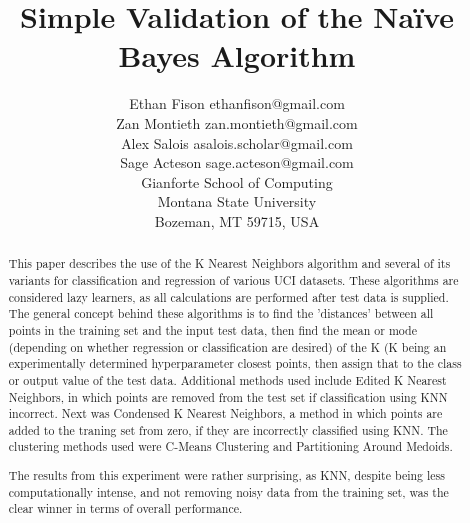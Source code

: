 \documentclass[twoside,11pt]{article}
\begin{document}
\title{Simple Validation of the Naïve Bayes Algorithm}

\author{\name Ethan Fison \email ethanfison@gmail.com \\
        \name Zan Montieth \email zan.montieth@gmail.com \\
        \name Alex Salois \email asalois.scholar@gmail.com \\ 
        \name Sage Acteson \email sage.acteson@gmail.com \\ 
       \addr Gianforte School of Computing\\
       Montana State University\\
       Bozeman, MT 59715, USA}



\maketitle

\begin{abstract}%

This paper describes the use of the K Nearest Neighbors algorithm and several of 
its variants for classification and regression of various UCI datasets. These
algorithms are considered lazy learners, as all calculations are performed after
test data is supplied. The general concept behind these algorithms is to find 
the 'distances' between all points in the training set and the input test data, then
find the mean or mode (depending on whether regression or classification are desired)
of the K (K being an experimentally determined hyperparameter closest points, then 
assign that to the class or output value of the test data. Additional methods used include 
Edited K Nearest Neighbors, in which points are removed from the test set if classification
using KNN incorrect. Next was Condensed K Nearest Neighbors, a method in which points are
added to the traning set from zero, if they are incorrectly classified using KNN. The 
clustering methods used were C-Means Clustering and Partitioning Around Medoids.

The results from this experiment were rather surprising, as KNN, despite being less computationally
intense, and not removing noisy data from the training set, was the clear winner in terms of 
overall performance.

\end{abstract}
\end{document}
